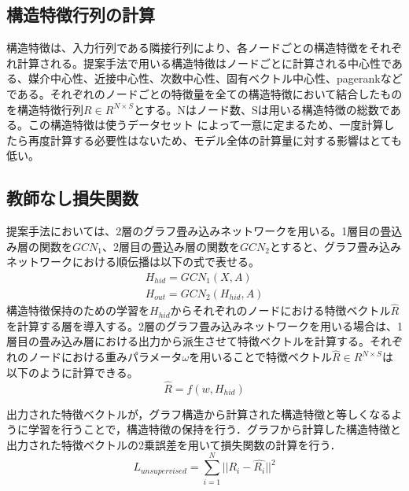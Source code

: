 \subsection{構造特徴行列の計算}
構造特徴は、入力行列である隣接行列により、各ノードごとの構造特徴をそれぞれ計算される。提案手法で用いる構造特徴はノードごとに計算される中心性である、媒介中心性、近接中心性、次数中心性、固有ベクトル中心性、pagerankなどである。それぞれのノードごとの特徴量を全ての構造特徴において結合したものを構造特徴行列$ R\in R^{N\times S}$とする。Nはノード数、Sは用いる構造特徴の総数である。この構造特徴は使うデータセット によって一意に定まるため、一度計算したら再度計算する必要性はないため、モデル全体の計算量に対する影響はとても低い。

\subsection{教師なし損失関数}

提案手法においては、2層のグラフ畳み込みネットワークを用いる。1層目の畳込み層の関数を$GCN_1$、2層目の畳込み層の関数を$GCN_2$とすると、グラフ畳み込みネットワークにおける順伝播は以下の式で表せる。\\
\begin{eqnarray}
H_{hid} = GCN_1(X,A)\\
H_{out}=GCN_2(H_{hid} , A)
\end{eqnarray}
構造特徴保持のための学習を$H_{hid}$からそれぞれのノードにおける特徴ベクトル$\hat{R}$を計算する層を導入する。2層のグラフ畳み込みネットワークを用いる場合は、1層目の畳み込み層における出力から派生させて特徴ベクトルを計算する。それぞれのノードにおける重みパラメータ{\bf $\omega$}を用いることで特徴ベクトル$\hat{R} \in R^{N\times S}$は以下のように計算できる。
\begin{equation}
\hat{R} = f(w, H_{hid})
\end{equation}

出力された特徴ベクトルが，グラフ構造から計算された構造特徴と等しくなるように学習を行うことで，構造特徴の保持を行う．グラフから計算した構造特徴と出力された特徴ベクトルの2乗誤差を用いて損失関数の計算を行う．
\begin{equation}
L_{unsupervised} = \sum_{i=1}^{N} ||R_{i} - \hat{R_{i}}||^{2}
\end{equation}




